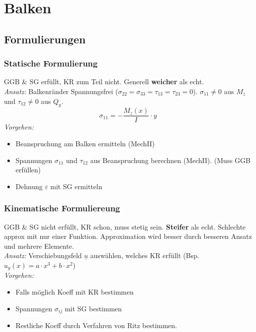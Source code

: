\section{Balken}
    \subsection{Formulierungen}
        \subsubsection{Statische Formulierung}
            GGB \& SG erfüllt, KR zum Teil nicht. Generell \textbf{weicher} als echt.
            \\\textit{Ansatz:} Balkenränder Spannungsfrei ($\sigma_{22}=\sigma_{33}=\tau_{13}=\tau_{23}=0$). $\sigma_{11} \neq 0$ aus $M_z$ und $\tau_{12} \neq 0$ aus $Q_y$.
                \[\sigma_{11}=-\frac{M_z(x)}{I}\cdot y\]
            \textit{Vorgehen:}
            \begin{itemize}
                \item Beanspruchung am Balken ermitteln (MechII)
                \item Spannungen $\sigma_{11}$ und $\tau_{12}$ aus Beanspruchung berechnen (MechII). (Muss GGB erfüllen)
                \item Dehnung $\varepsilon$ mit SG ermitteln
            \end{itemize}
        \subsubsection{Kinematische Formuliereung}
            GGB \& SG nicht erfüllt, KR schon, muss stetig sein. \textbf{Steifer} als echt. Schlechte approx mit nur einer Funktion. Approximation wird besser durch besseren Ansatz und mehrere Elemente.
            \\\textit{Ansatz:} Verschiebungsfeld $\underline{u}$ auswählen, welches KR erfüllt (Bsp. $u_y(x) = a\cdot x^3+b\cdot x^2$)
            \\\textit{Vorgehen:}
            \begin{itemize}
                \item Falls möglich Koeff mit KR bestimmen
                \item Spannungen $\sigma_{ij}$ mit SG bestimmen
                \item Restliche Koeff durch Verfahren von Ritz bestimmen.
            \end{itemize}
            \vspace{1mm}
            
